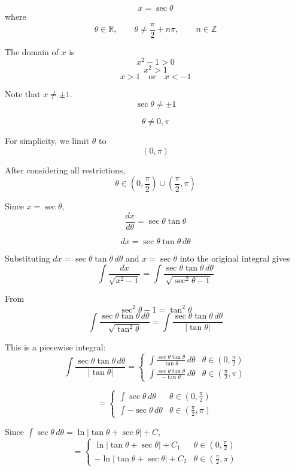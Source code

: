 \documentclass[12pt]{article}
\begin{document}
\[
x = \sec \theta
\]
where
\[
\theta \in \mathbb{R}, \qquad \theta \ne \frac{\pi}{2} + n\pi, \qquad n \in \mathbb{Z}
\]

The domain of \(x\) is
\[
x^2 - 1 > 0
\]
\[
x^2 > 1
\]
\[
x > 1 \quad \text{or} \quad x < -1
\]

Note that \(x \ne \pm 1\).
\[
\sec \theta \ne \pm 1
\]

\[
\theta \ne 0, \pi
\]

For simplicity, we limit \(\theta\) to
\[
(0,\pi)
\]

After considering all restrictions,
\[
\theta \in \left(0,\frac{\pi}{2}\right) \cup \left(\frac{\pi}{2},\pi\right)
\]

Since \(x = \sec \theta\),
\[
\frac{dx}{d\theta} = \sec \theta \tan \theta
\]

\[
dx = \sec \theta \tan \theta \, d\theta
\]

Substituting \(dx = \sec \theta \tan \theta \, d\theta\) and \(x = \sec \theta\) into the original integral gives
\[
\int \frac{dx}{\sqrt{x^2 - 1}}
=
\int \frac{\sec \theta \tan \theta \, d\theta}{\sqrt{\sec^2 \theta - 1}}
\]

From
\[
\sec^2 \theta - 1 = \tan^2 \theta
\]
\[
\int \frac{\sec \theta \tan \theta \, d\theta}{\sqrt{\tan^2 \theta}}
=
\int \frac{\sec \theta \tan \theta \, d\theta}{|\tan \theta|}
\]

This is a piecewise integral:
\[
\int \frac{\sec \theta \tan \theta \, d\theta}{|\tan \theta|}
=
\begin{cases}
\displaystyle \int \frac{\sec \theta \tan \theta}{\tan \theta} \, d\theta
& \theta \in \left(0,\frac{\pi}{2}\right) \\[1.2em]
\displaystyle \int \frac{\sec \theta \tan \theta}{-\tan \theta} \, d\theta
& \theta \in \left(\frac{\pi}{2},\pi\right)
\end{cases}
\]

\[
=
\begin{cases}
\displaystyle \int \sec \theta \, d\theta
& \theta \in \left(0,\frac{\pi}{2}\right) \\[1.2em]
\displaystyle \int -\sec \theta \, d\theta
& \theta \in \left(\frac{\pi}{2},\pi\right)
\end{cases}
\]

Since \(\int \sec \theta \, d\theta=\ln |\tan \theta + \sec \theta| + C\),
\[
=
\begin{cases}
\ln |\tan \theta + \sec \theta| + C_1
& \theta \in \left(0,\frac{\pi}{2}\right) \\[0.8em]
-\ln |\tan \theta + \sec \theta| + C_2
& \theta \in \left(\frac{\pi}{2},\pi\right)
\end{cases}
\]
\end{document}
